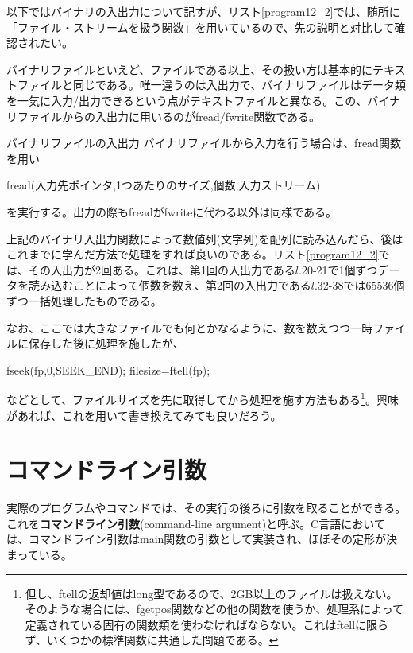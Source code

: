 以下ではバイナリの入出力について記すが、リスト\ref{program12_2}では、随所に「ファイル・ストリームを扱う関数」を用いているので、先の説明と対比して確認されたい。

バイナリファイルといえど、ファイルである以上、その扱い方は基本的にテキストファイルと同じである。唯一違うのは入出力で、バイナリファイルはデータ類を一気に入力/出力できるという点がテキストファイルと異なる。この、バイナリファイルからの入出力に用いるのがfread/fwrite関数である。
\begin{itembox}[l]{バイナリファイルの入出力}
バイナリファイルから入力を行う場合は、fread関数を用い
\begin{code}
fread(入力先ポインタ,1つあたりのサイズ,個数,入力ストリーム)
\end{code}
を実行する。出力の際もfreadがfwriteに代わる以外は同様である。
\end{itembox}

上記のバイナリ入出力関数によって数値列(文字列)を配列に読み込んだら、後はこれまでに学んだ方法で処理をすれば良いのである。リスト\ref{program12_2}では、その入出力が2回ある。これは、第1回の入出力である$l$.20-21で1個ずつデータを読み込むことによって個数を数え、第2回の入出力である$l$.32-38では65536個ずつ一括処理したものである。

なお、ここでは大きなファイルでも何とかなるように、数を数えつつ一時ファイルに保存した後に処理を施したが、
\begin{code}
fseek(fp,0,SEEK_END);
filesize=ftell(fp);
\end{code}
などとして、ファイルサイズを先に取得してから処理を施す方法もある\footnote{但し、ftellの返却値はlong型であるので、2GB以上のファイルは扱えない。そのような場合には、fgetpos関数などの他の関数を使うか、処理系によって定義されている固有の関数類を使わなければならない。これはftellに限らず、いくつかの標準関数に共通した問題である。}。興味があれば、これを用いて書き換えてみても良いだろう。

\section{コマンドライン引数}
実際のプログラムやコマンドでは、その実行の後ろに引数を取ることができる。これを\textbf{コマンドライン引数}(command-line argument)と呼ぶ。C言語においては、コマンドライン引数はmain関数の引数として実装され、ほぼその定形が決まっている。
